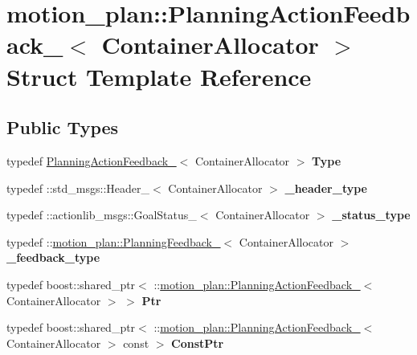 \hypertarget{structmotion__plan_1_1PlanningActionFeedback__}{}\section{motion\+\_\+plan\+:\+:Planning\+Action\+Feedback\+\_\+$<$ Container\+Allocator $>$ Struct Template Reference}
\label{structmotion__plan_1_1PlanningActionFeedback__}
\subsection*{Public Types}
\begin{DoxyCompactItemize}
\item 
\mbox{\label{structmotion__plan_1_1PlanningActionFeedback___a22dc5b2f4b618cb48daba9712efb87ef}} 
typedef \hyperlink{structmotion__plan_1_1PlanningActionFeedback__}{Planning\+Action\+Feedback\+\_\+}$<$ Container\+Allocator $>$ {\bfseries Type}
\item 
\mbox{\label{structmotion__plan_1_1PlanningActionFeedback___a2ef8b2620b8e49dce6f60965b04c9344}} 
typedef \+::std\+\_\+msgs\+::\+Header\+\_\+$<$ Container\+Allocator $>$ {\bfseries \+\_\+header\+\_\+type}
\item 
\mbox{\label{structmotion__plan_1_1PlanningActionFeedback___a1ac2846fd6105720919351c79b735a93}} 
typedef \+::actionlib\+\_\+msgs\+::\+Goal\+Status\+\_\+$<$ Container\+Allocator $>$ {\bfseries \+\_\+status\+\_\+type}
\item 
\mbox{\label{structmotion__plan_1_1PlanningActionFeedback___a2bf571ad095d47cf3dd7763eb6ee646c}} 
typedef \+::\hyperlink{structmotion__plan_1_1PlanningFeedback__}{motion\+\_\+plan\+::\+Planning\+Feedback\+\_\+}$<$ Container\+Allocator $>$ {\bfseries \+\_\+feedback\+\_\+type}
\item 
\mbox{\label{structmotion__plan_1_1PlanningActionFeedback___a88c27b4922772688378794ea647e1bda}} 
typedef boost\+::shared\+\_\+ptr$<$ \+::\hyperlink{structmotion__plan_1_1PlanningActionFeedback__}{motion\+\_\+plan\+::\+Planning\+Action\+Feedback\+\_\+}$<$ Container\+Allocator $>$ $>$ {\bfseries Ptr}
\item 
\mbox{\label{structmotion__plan_1_1PlanningActionFeedback___ae2222e23457d9c9eabf04e2743fcdaaa}} 
typedef boost\+::shared\+\_\+ptr$<$ \+::\hyperlink{structmotion__plan_1_1PlanningActionFeedback__}{motion\+\_\+plan\+::\+Planning\+Action\+Feedback\+\_\+}$<$ Container\+Allocator $>$ const  $>$ {\bfseries Const\+Ptr}
\end{DoxyCompactItemize}
